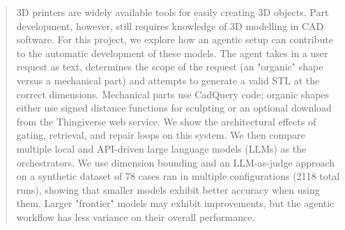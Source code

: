 \begin{abstract}
3D printers are widely available tools for easily creating 3D objects.
Part development, however, still requires knowledge of 3D modelling in CAD software.
For this project, we explore how an agentic setup can contribute to the automatic development of these models.
The agent takes in a user request as text, determines the scope of the request (an "organic" shape versus a mechanical part) and attempts to generate a valid STL at the correct dimensions.
Mechanical parts use CadQuery code; organic shapes either use signed distance functions for sculpting or an optional download from the Thingiverse web service.
We show the architectural effects of gating, retrieval, and repair loops on this system.
We then compare multiple local and API-driven large language models (LLMs) as the orchestrators.
We use dimension bounding and an LLM-as-judge approach on a synthetic dataset of 78 cases ran in multiple configurations (2118 total runs), showing that smaller models exhibit better accuracy when using them.
Larger "frontier" models may exhibit improvements, but the agentic workflow has less variance on their overall performance.

\end{abstract}
